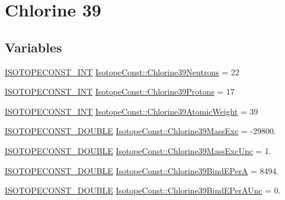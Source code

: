 \hypertarget{group___isotope_const-_chlorine-_cl39}{}\section{Chlorine 39}
\label{group___isotope_const-_chlorine-_cl39}
\subsection*{Variables}
\begin{DoxyCompactItemize}
\item 
\mbox{\hyperlink{group___isotope_const-_macros_ga5f18360b3e99483a35c32d789e62621c}{I\+S\+O\+T\+O\+P\+E\+C\+O\+N\+S\+T\+\_\+\+I\+NT}} \mbox{\hyperlink{group___isotope_const-_chlorine-_cl39_gabc04aeb55b9c2d9dc93811a64dc29941}{Isotope\+Const\+::\+Chlorine39\+Neutrons}} = 22
\item 
\mbox{\hyperlink{group___isotope_const-_macros_ga5f18360b3e99483a35c32d789e62621c}{I\+S\+O\+T\+O\+P\+E\+C\+O\+N\+S\+T\+\_\+\+I\+NT}} \mbox{\hyperlink{group___isotope_const-_chlorine-_cl39_ga214e9b9e3adc991c4d235bb6202daffa}{Isotope\+Const\+::\+Chlorine39\+Protons}} = 17
\item 
\mbox{\hyperlink{group___isotope_const-_macros_ga5f18360b3e99483a35c32d789e62621c}{I\+S\+O\+T\+O\+P\+E\+C\+O\+N\+S\+T\+\_\+\+I\+NT}} \mbox{\hyperlink{group___isotope_const-_chlorine-_cl39_ga9880ccfca351331291a60163d4ea4cc6}{Isotope\+Const\+::\+Chlorine39\+Atomic\+Weight}} = 39
\item 
\mbox{\hyperlink{group___isotope_const-_macros_ga8f45a7272ce02c0b4c65c44636ed719a}{I\+S\+O\+T\+O\+P\+E\+C\+O\+N\+S\+T\+\_\+\+D\+O\+U\+B\+LE}} \mbox{\hyperlink{group___isotope_const-_chlorine-_cl39_ga045afb8b19333357bab57b09764fb0f9}{Isotope\+Const\+::\+Chlorine39\+Mass\+Exc}} = -\/29800.
\item 
\mbox{\hyperlink{group___isotope_const-_macros_ga8f45a7272ce02c0b4c65c44636ed719a}{I\+S\+O\+T\+O\+P\+E\+C\+O\+N\+S\+T\+\_\+\+D\+O\+U\+B\+LE}} \mbox{\hyperlink{group___isotope_const-_chlorine-_cl39_gaac109d4d622636bf01c0c086b287e155}{Isotope\+Const\+::\+Chlorine39\+Mass\+Exc\+Unc}} = 1.
\item 
\mbox{\hyperlink{group___isotope_const-_macros_ga8f45a7272ce02c0b4c65c44636ed719a}{I\+S\+O\+T\+O\+P\+E\+C\+O\+N\+S\+T\+\_\+\+D\+O\+U\+B\+LE}} \mbox{\hyperlink{group___isotope_const-_chlorine-_cl39_ga5f810bfcbf842448ce2f9d8ba3faf31e}{Isotope\+Const\+::\+Chlorine39\+Bind\+E\+PerA}} = 8494.
\item 
\mbox{\hyperlink{group___isotope_const-_macros_ga8f45a7272ce02c0b4c65c44636ed719a}{I\+S\+O\+T\+O\+P\+E\+C\+O\+N\+S\+T\+\_\+\+D\+O\+U\+B\+LE}} \mbox{\hyperlink{group___isotope_const-_chlorine-_cl39_ga9530e63d361145b02aa60916aa015761}{Isotope\+Const\+::\+Chlorine39\+Bind\+E\+Per\+A\+Unc}} = 0.

\end{DoxyCompactItemize}
